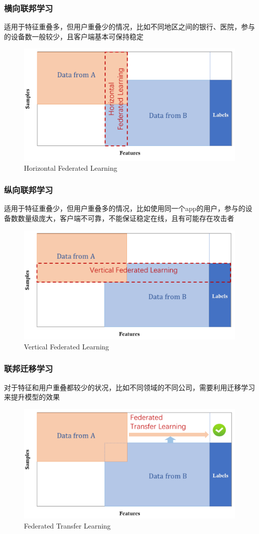 \documentclass[hyperref={pdfpagelabels=false}]{beamer}
\begin{document}
\begin{frame}
	\frametitle{横向联邦学习}
	\begin{block}{}
		适用于特征重叠多，但用户重叠少的情况，比如不同地区之间的银行、医院，参与的设备数一般较少，且客户端基本可保持稳定
	\end{block}
	\begin{figure}
		\centering
		\includegraphics[width=.6\textwidth]{./figure/hor-fl.png}
		\caption{Horizontal Federated Learning\cite{yang2019federated}}
	\end{figure}
\end{frame}

\begin{frame}
	\frametitle{纵向联邦学习}
	\begin{block}{}
		适用于特征重叠少，但用户重叠多的情况，比如使用同一个app的用户，参与的设备数数量级庞大，客户端不可靠，不能保证稳定在线，且有可能存在攻击者
	\end{block}
	\begin{figure}
		\centering
		\includegraphics[width=.6\textwidth]{./figure/ver-fl.png}
		\caption{Vertical Federated Learning\cite{yang2019federated}}
	\end{figure}
\end{frame}

\begin{frame}
	\frametitle{联邦迁移学习}
	\begin{block}{}
		对于特征和用户重叠都较少的状况，比如不同领域的不同公司，需要利用迁移学习来提升模型的效果
	\end{block}
	\begin{figure}
		\centering
		\includegraphics[width=.6\textwidth]{./figure/fl-tran.png}
		\caption{Federated Transfer Learning\cite{yang2019federated}}
	\end{figure}
\end{frame}
\end{document}
